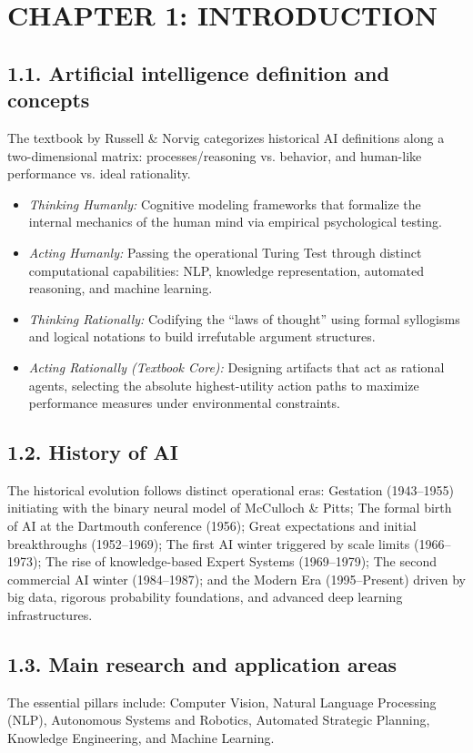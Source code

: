 \documentclass[11pt,a4paper]{article}
\begin{document}
\vspace{0.5cm}

\section{CHAPTER 1: INTRODUCTION}

\subsection{1.1. Artificial intelligence definition and concepts}
The textbook by Russell \& Norvig categorizes historical AI definitions along a two-dimensional matrix: processes/reasoning vs. behavior, and human-like performance vs. ideal rationality.
\begin{itemize}
    \item \textit{Thinking Humanly:} Cognitive modeling frameworks that formalize the internal mechanics of the human mind via empirical psychological testing.
    \item \textit{Acting Humanly:} Passing the operational Turing Test through distinct computational capabilities: NLP, knowledge representation, automated reasoning, and machine learning.
    \item \textit{Thinking Rationally:} Codifying the ``laws of thought'' using formal syllogisms and logical notations to build irrefutable argument structures.
    \item \textit{Acting Rationally (Textbook Core):} Designing artifacts that act as rational agents, selecting the absolute highest-utility action paths to maximize performance measures under environmental constraints.
\end{itemize}

\subsection{1.2. History of AI}
The historical evolution follows distinct operational eras: Gestation (1943--1955) initiating with the binary neural model of McCulloch \& Pitts; The formal birth of AI at the Dartmouth conference (1956); Great expectations and initial breakthroughs (1952--1969); The first AI winter triggered by scale limits (1966--1973); The rise of knowledge-based Expert Systems (1969--1979); The second commercial AI winter (1984--1987); and the Modern Era (1995--Present) driven by big data, rigorous probability foundations, and advanced deep learning infrastructures.

\subsection{1.3. Main research and application areas}
The essential pillars include: Computer Vision, Natural Language Processing (NLP), Autonomous Systems and Robotics, Automated Strategic Planning, Knowledge Engineering, and Machine Learning.
\end{document}
